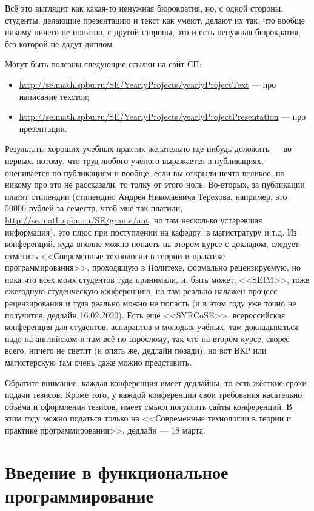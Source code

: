 \documentclass[a5paper]{article}
\begin{document}
Всё это выглядит как какая-то ненужная бюрократия, но, с одной стороны, студенты, делающие презентацию и текст как умеют, делают их так, что вообще никому ничего не понятно, с другой стороны, это и есть ненужная бюрократия, без которой не дадут диплом.

Могут быть полезны следующие ссылки на сайт СП: 
\begin{itemize}
	\item \url{http://se.math.spbu.ru/SE/YearlyProjects/yearlyProjectText} --- про написание текстов;
	\item \url{http://se.math.spbu.ru/SE/YearlyProjects/yearlyProjectPresentation} --- про презентации.
\end{itemize}

Результаты хороших учебных практик желательно где-нибудь доложить --- во-первых, потому, что труд любого учёного выражается в публикациях, оценивается по публикациям и вообще, если вы открыли нечто великое, но никому про это не рассказали, то толку от этого ноль. Во-вторых, за публикации платят стипендии (стипендию Андрея Николаевича Терехова, например, это 50000 рублей за семестр, чтоб мне так платили, \url{http://se.math.spbu.ru/SE/grants/ant}, но там несколько устаревшая информация), это плюс при поступлении на кафедру, в магистратуру и т.д. Из конференций, куда вполне можно попасть на втором курсе с докладом, следует отметить <<Современные технологии в теории и практике программирования>>, проходящую в Политехе, формально рецензируемую, но пока что всех моих студентов туда принимали, и, быть может, <<SEIM>>, тоже ежегодную студенческую конференцию, но там реально налажен процесс рецензирования и туда реально можно не попасть (и в этом году уже точно не получится, дедлайн 16.02.2020). Есть ещё <<SYRCoSE>>, всероссийская конференция для студентов, аспирантов и молодых учёных, там докладываться надо на английском и там всё по-взрослому, так что на втором курсе, скорее всего, ничего не светит (и опять же, дедлайн позади), но вот ВКР или магистерскую там очень даже можно представить. 

Обратите внимание, каждая конференция имеет дедлайны, то есть жёсткие сроки подачи тезисов. Кроме того, у каждой конференции свои требования касательно объёма и оформления тезисов, имеет смысл погуглить сайты конференций. В этом году можно податься только на <<Современные технологии в теории и практике программирования>>, дедлайн --- 18 марта.

\section{Введение в функциональное программирование}
\end{document}
